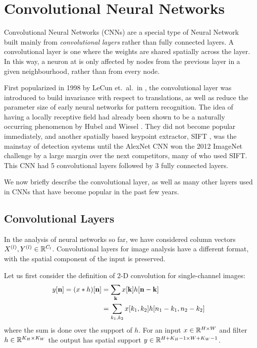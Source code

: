 \section{Convolutional Neural Networks}
Convolutional Neural Networks (CNNs) are a special type of Neural Network built mainly from 
\emph{convolutional layers} rather than fully connected layers. A convolutional
layer is one where the weights are shared spatially across the layer. 
In this way, a neuron at is only affected by
nodes from the previous layer in a given neighbourhood, rather than from every node.

First popularized in 1998 by LeCun et.\ al.\ in \cite{lecun_gradient-based_1998},
the convolutional layer was introduced to build invariance with respect to
translations, as well as reduce the parameter size of early neural networks for
pattern recognition. The idea of having a locally receptive field had already
been shown to be a naturally occurring phenomenon by Hubel and Wiesel
\cite{hubel_receptive_1962}. They did not become popular immediately, and
another spatially based keypoint extractor, SIFT \cite{lowe_distinctive_2004},
was the mainstay of detection systems until the AlexNet CNN
\cite{krizhevsky_imagenet_2012} won the 2012 ImageNet challenge
\cite{russakovsky_imagenet_2014} by a large margin over the next competitors, many of 
who used SIFT. This CNN had 5 convolutional layers followed by 3 fully
connected layers.

We now briefly describe the convolutional layer, as well as many other layers
used in CNNs that have become popular in the past few years.

\subsection{Convolutional Layers}\label{sec:ch2:conv_layers}
In the analysis of neural networks so far, we have considered column vectors 
$X^{(l)},Y^{(l)} \in \reals[C_{l}]$. Convolutional layers for image analysis
have a different format, with the spatial component of the input is
preserved. 

Let us first consider the definition of 2-D convolution for single-channel
images:
\begin{align}
  y[\nn] = (x\conv h)[\nn] &= \sum_{\mathbf{k}} x[\mathbf{k}]h[\nn-\mathbf{k}] \label{eq:ch2:conv1}\\
                           &= \sum_{k_1, k_2} x[k_1,k_2]h[n_1-k_1, n_2-k_2]
\end{align}
where the sum is done over the support of $h$. For an input $x\in \reals[H\x W]$
and filter $h\in \reals[K_H\x K_W]$ the output has spatial support $y\in
\reals[H+K_H-1 \x W+K_W-1]$. 

